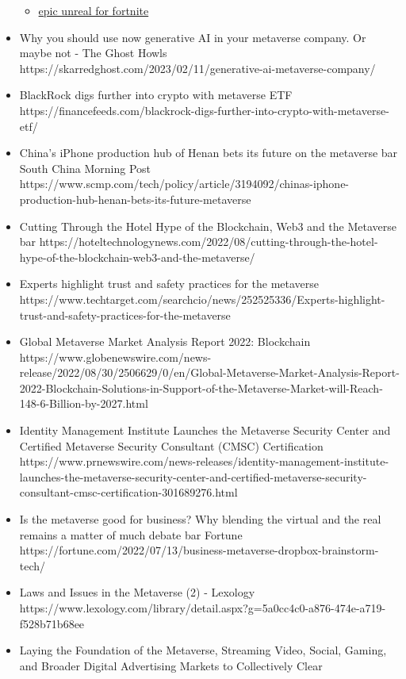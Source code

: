 \begin{itemize}
\begin{itemize}
  \item
    \href{https://store.epicgames.com/en-US/p/fortnite--uefn?}{epic
    unreal for fortnite}
  \end{itemize}
\item
  Why you should use now generative AI in your metaverse company. Or
  maybe not - The Ghost Howls
  https://skarredghost.com/2023/02/11/generative-ai-metaverse-company/
\item
  BlackRock digs further into crypto with metaverse ETF
  https://financefeeds.com/blackrock-digs-further-into-crypto-with-metaverse-etf/
\item
  China's iPhone production hub of Henan bets its future on the
  metaverse bar{} South China Morning Post
  https://www.scmp.com/tech/policy/article/3194092/chinas-iphone-production-hub-henan-bets-its-future-metaverse
\item
  Cutting Through the Hotel Hype of the Blockchain, Web3 and the
  Metaverse bar{}
  https://hoteltechnologynews.com/2022/08/cutting-through-the-hotel-hype-of-the-blockchain-web3-and-the-metaverse/
\item
  Experts highlight trust and safety practices for the metaverse
  https://www.techtarget.com/searchcio/news/252525336/Experts-highlight-trust-and-safety-practices-for-the-metaverse
\item
  Global Metaverse Market Analysis Report 2022: Blockchain
  https://www.globenewswire.com/news-release/2022/08/30/2506629/0/en/Global-Metaverse-Market-Analysis-Report-2022-Blockchain-Solutions-in-Support-of-the-Metaverse-Market-will-Reach-148-6-Billion-by-2027.html
\item
  Identity Management Institute Launches the Metaverse Security Center
  and Certified Metaverse Security Consultant (CMSC)  Certification
  https://www.prnewswire.com/news-releases/identity-management-institute-launches-the-metaverse-security-center-and-certified-metaverse-security-consultant-cmsc-certification-301689276.html
\item
  Is the metaverse good for business? Why blending the virtual and the
  real remains a matter of much debate bar{} Fortune
  https://fortune.com/2022/07/13/business-metaverse-dropbox-brainstorm-tech/
\item
  Laws and Issues in the Metaverse (2) - Lexology
  https://www.lexology.com/library/detail.aspx?g=5a0cc4c0-a876-474e-a719-f528b71b68ee
\item
  Laying the Foundation of the Metaverse, Streaming Video, Social,
  Gaming, and Broader Digital Advertising Markets to Collectively Clear

\end{itemize}
